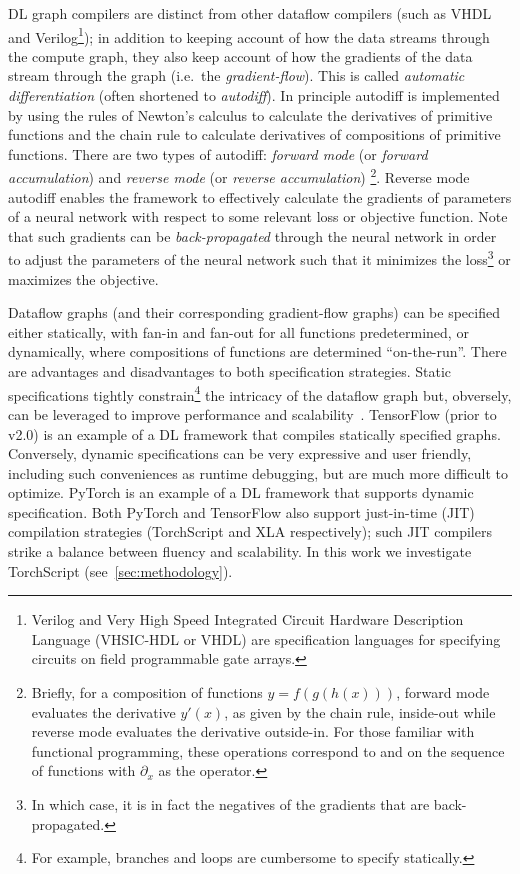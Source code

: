 


DL graph compilers are distinct from other dataflow compilers (such as VHDL and Verilog\footnote{Verilog and Very High Speed Integrated Circuit Hardware Description Language (VHSIC-HDL or VHDL) are specification languages for specifying circuits on field programmable gate arrays.}); in addition to keeping account of how the data streams through the compute graph, they also keep account of how the gradients of the data stream through the graph (i.e.\ the \textit{gradient-flow}).
This is called \textit{automatic differentiation} (often shortened to \textit{autodiff}).
In principle autodiff is implemented by using the rules of Newton's calculus to calculate the derivatives of primitive functions and the chain rule to calculate derivatives of compositions of primitive functions.
There are two types of autodiff: \textit{forward mode} (or \textit{forward accumulation}) and \textit{reverse mode} (or \textit{reverse accumulation})%
\footnote{Briefly, for a composition of functions $y=f(g(h(x)))$, forward mode evaluates the derivative $y'(x)$, as given by the chain rule, inside-out while reverse mode evaluates the derivative outside-in. For those familiar with functional programming, these operations correspond to  and  on the sequence of functions with $\partial_x$ as the operator.}.
Reverse mode autodiff enables the framework to effectively calculate the gradients of parameters of a neural network with respect to some relevant loss or objective function.
Note that such gradients can be \textit{back-propagated} through the neural network in order to adjust the parameters of the neural network such that it minimizes the loss\footnote{In which case, it is in fact the negatives of the gradients that are back-propagated.} or maximizes the objective.

Dataflow graphs (and their corresponding gradient-flow graphs) can be specified either statically, with fan-in and fan-out for all functions predetermined, or dynamically, where compositions of functions are determined ``on-the-run''.
There are advantages and disadvantages to both specification strategies.
Static specifications tightly constrain\footnote{For example, branches and loops are cumbersome to specify statically.} the intricacy of the dataflow graph but, obversely, can be leveraged to improve performance and scalability~\cite{le2019tflms,Pradelle2017PolyhedralOO}.
TensorFlow (prior to v2.0) is an example of a DL framework that compiles statically specified graphs.
Conversely, dynamic specifications can be very expressive and user friendly, including such conveniences as runtime debugging, but are much more difficult to optimize.
PyTorch is an example of a DL framework that supports dynamic specification.
Both PyTorch and TensorFlow also support just-in-time (JIT) compilation strategies (TorchScript and XLA respectively);
such JIT compilers strike a balance between fluency and scalability.
In this work we investigate TorchScript (see~\cref{sec:methodology}).

